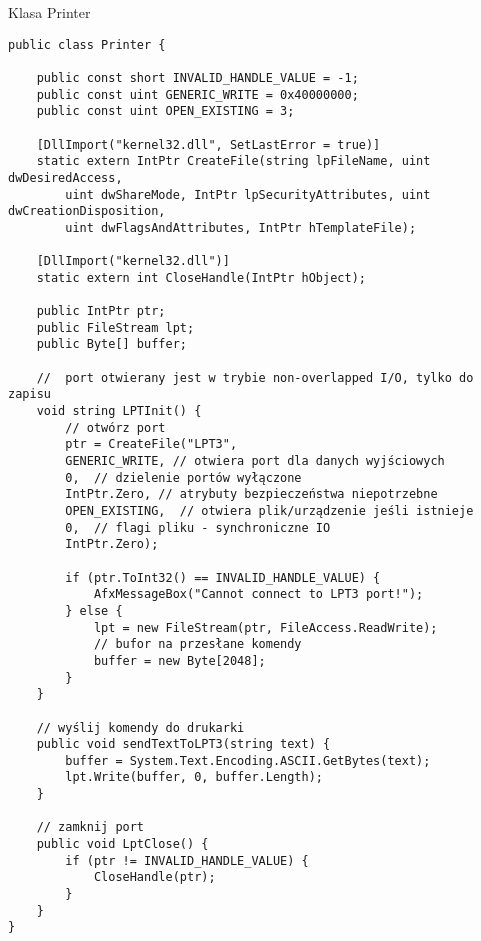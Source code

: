 \documentclass{article}
\newenvironment{longlisting}{}{}
\begin{document}
\begin{listing}
\caption{Klasa Printer}
\end{listing}
\begin{longlisting}
\begin{verbatim}
public class Printer {
    
    public const short INVALID_HANDLE_VALUE = -1;
    public const uint GENERIC_WRITE = 0x40000000;
    public const uint OPEN_EXISTING = 3;

    [DllImport("kernel32.dll", SetLastError = true)]
    static extern IntPtr CreateFile(string lpFileName, uint dwDesiredAccess,
        uint dwShareMode, IntPtr lpSecurityAttributes, uint dwCreationDisposition,
        uint dwFlagsAndAttributes, IntPtr hTemplateFile);
        
    [DllImport("kernel32.dll")]
    static extern int CloseHandle(IntPtr hObject);

    public IntPtr ptr;
    public FileStream lpt;
    public Byte[] buffer;

    //  port otwierany jest w trybie non-overlapped I/O, tylko do zapisu
    void string LPTInit() {
        // otwórz port
        ptr = CreateFile("LPT3",
        GENERIC_WRITE, // otwiera port dla danych wyjściowych
        0,  // dzielenie portów wyłączone
        IntPtr.Zero, // atrybuty bezpieczeństwa niepotrzebne
        OPEN_EXISTING,  // otwiera plik/urządzenie jeśli istnieje
        0,  // flagi pliku - synchroniczne IO
        IntPtr.Zero);
        
        if (ptr.ToInt32() == INVALID_HANDLE_VALUE) {
            AfxMessageBox("Cannot connect to LPT3 port!");
        } else {
            lpt = new FileStream(ptr, FileAccess.ReadWrite);
            // bufor na przesłane komendy
            buffer = new Byte[2048];
        }
    }
    
    // wyślij komendy do drukarki
    public void sendTextToLPT3(string text) {
        buffer = System.Text.Encoding.ASCII.GetBytes(text);
        lpt.Write(buffer, 0, buffer.Length);
    }
    
    // zamknij port
    public void LptClose() {
        if (ptr != INVALID_HANDLE_VALUE) {
            CloseHandle(ptr);
        }
    }
}
\end{verbatim}
\label{lst:printer_class}
\end{longlisting}
\end{document}
